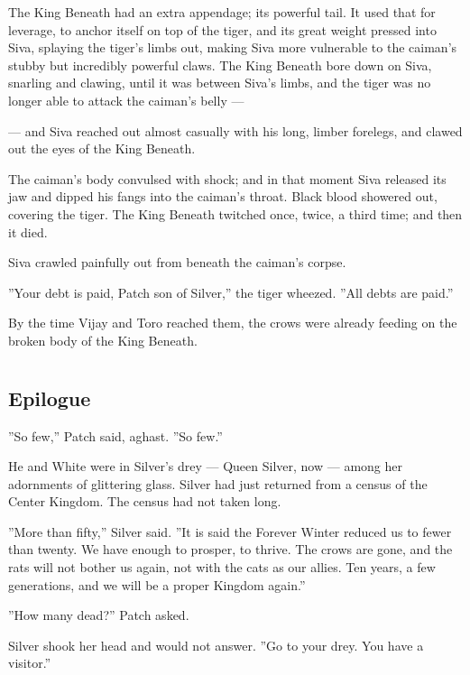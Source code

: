 \documentclass[12pt]{book}
\begin{document}
The King Beneath had an extra appendage; its powerful tail. It used
that for leverage, to anchor itself on top of the tiger, and its great
weight pressed into Siva, splaying the tiger's limbs out, making Siva
more vulnerable to the caiman's stubby but incredibly powerful
claws. The King Beneath bore down on Siva, snarling and clawing, until
it was between Siva's limbs, and the tiger was no longer able to
attack the caiman's belly ---

--- and Siva reached out almost casually with his long, limber
forelegs, and clawed out the eyes of the King Beneath.

The caiman's body convulsed with shock; and in that moment Siva
released its jaw and dipped his fangs into the caiman's throat. Black
blood showered out, covering the tiger. The King Beneath twitched
once, twice, a third time; and then it died.

Siva crawled painfully out from beneath the caiman's corpse.

''Your debt is paid, Patch son of Silver,'' the tiger wheezed. ''All
debts are paid.''

By the time Vijay and Toro reached them, the crows were already
feeding on the broken body of the King Beneath.


\chapter{}

\section{Epilogue}

''So few,'' Patch said, aghast. ''So few.''

He and White were in Silver's drey --- Queen Silver, now --- among her
adornments of glittering glass. Silver had just returned from a census
of the Center Kingdom. The census had not taken long.

''More than fifty,'' Silver said. ''It is said the Forever Winter
reduced us to fewer than twenty. We have enough to prosper, to
thrive. The crows are gone, and the rats will not bother us again, not
with the cats as our allies. Ten years, a few generations, and we will
be a proper Kingdom again.''

''How many dead?'' Patch asked.

Silver shook her head and would not answer. ''Go to your drey. You
have a visitor.''
\end{document}
